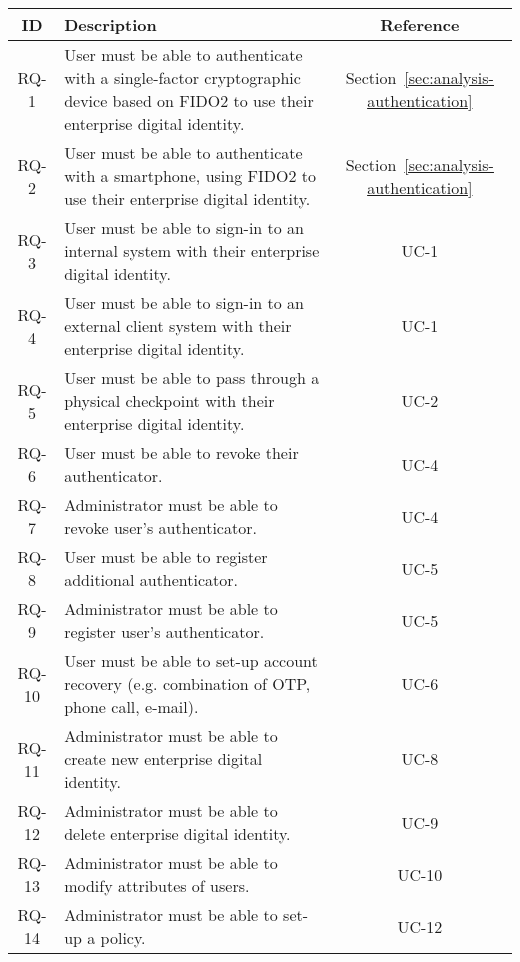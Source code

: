 \begin{table}[htbp!]
    \footnotesize
    \onehalfspacing
    \centering
    \begin{tabular}{|c|p{15cm}|c|}
    \hline
    \cellcolor[HTML]{CBCEFB}\textbf{ID}&\cellcolor[HTML]{CBCEFB}\textbf{Description}&\cellcolor[HTML]{CBCEFB}\textbf{Reference}\\
    \hline
    RQ-1&User must be able to authenticate with a single-factor cryptographic device based on FIDO2 to use their enterprise digital identity.&Section~\ref{sec:analysis-authentication}\\
    \hline
    RQ-2&User must be able to authenticate with a smartphone, using FIDO2 to use their enterprise digital identity.&Section~\ref{sec:analysis-authentication}\\
    \hline
    \hline
    RQ-3&User must be able to sign-in to an internal system with their enterprise digital identity.&UC-1\\
    \hline
    RQ-4&User must be able to sign-in to an external client system with their enterprise digital identity.&UC-1\\
    \hline
    \hline
    RQ-5&User must be able to pass through a physical checkpoint with their enterprise digital identity.&UC-2\\
    \hline
    \hline
    RQ-6&User must be able to revoke their authenticator.&UC-4\\
    \hline
    RQ-7&Administrator must be able to revoke user’s authenticator.&UC-4\\
    \hline
    \hline
    RQ-8&User must be able to register additional authenticator.&UC-5\\
    \hline
    RQ-9&Administrator must be able to register user’s authenticator.&UC-5\\
    \hline
    \hline
    RQ-10&User must be able to set-up account recovery (e.g. combination of OTP, phone call, e-mail).&UC-6\\
    \hline
    \hline
    RQ-11&Administrator must be able to create new enterprise digital identity.&UC-8\\
    \hline
    \hline
    RQ-12&Administrator must be able to delete enterprise digital identity.&UC-9\\
    \hline
    \hline
    RQ-13&Administrator must be able to modify attributes of users.&UC-10\\
    \hline
    \hline
    RQ-14&Administrator must be able to set-up a policy.&UC-12\\

\end{tabular}
\end{table}
